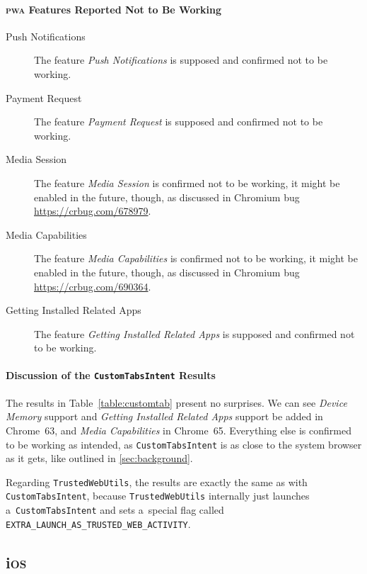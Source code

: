 \documentclass[sigconf]{acmart}
\begin{document}
\paragraph{\textsc{pwa} Features Reported Not to Be Working}

\begin{description}
  \item[Push Notifications] The feature \emph{Push Notifications} is supposed and confirmed not to be working.
  \item[Payment Request] The feature \emph{Payment Request} is supposed and confirmed not to be working.
  \item[Media Session] The feature \emph{Media Session} is confirmed not to be working,
    it might be enabled in the future, though, as discussed in Chromium bug
    \url{https://crbug.com/678979}.
  \item[Media Capabilities] The feature \emph{Media Capabilities} is confirmed not to be working,
    it might be enabled in the future, though, as discussed in Chromium bug
    \url{https://crbug.com/690364}.
  \item[Getting Installed Related Apps] The feature \emph{Getting Installed Related Apps}
    is supposed and confirmed not to be working.
\end{description} 

\paragraph{Discussion of the \texttt{CustomTabsIntent} Results}

The results in Table~\ref{table:customtab} present no surprises. 
We can see \emph{Device Memory} support and \emph{Getting Installed Related Apps} support
be added in Chrome~63, and \emph{Media Capabilities} in Chrome~65.
Everything else is confirmed to be working as intended,
as \texttt{CustomTabsIntent} is as close to the system browser as it gets,
like outlined in \autoref{sec:background}.

Regarding \texttt{TrustedWebUtils},
the results are exactly the same as with \texttt{CustomTabsIntent},
because \texttt{TrustedWebUtils} internally just launches a~\texttt{CustomTabsIntent}
and sets a~special flag called \texttt{EXTRA\_LAUNCH\_AS\_TRUSTED\_WEB\_ACTIVITY}.

\subsection{i\textsc{os}}
\end{document}
